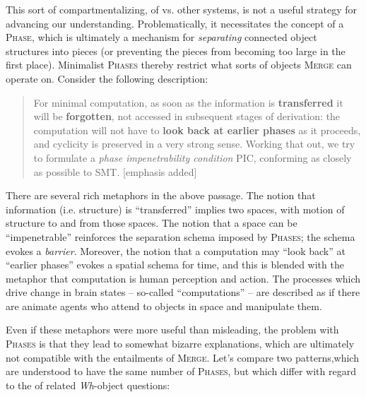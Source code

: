   This sort of compartmentalizing, of  vs. other systems, is not a useful strategy for advancing our understanding. Problematically, it necessitates the  concept of a \textsc{Phase}, which is ultimately a mechanism for \textit{separating} connected object structures into pieces (or preventing the pieces from becoming too large in the first place). Minimalist \textsc{Phases} thereby restrict what sorts of objects \textsc{Merge} can operate on. Consider the following description:

\begin{quote}
For minimal computation, as soon as the information is \textbf{transferred} it will be \textbf{forgotten}, not accessed in subsequent stages of derivation: the computation will not have to \textbf{look back at earlier phases} as it proceeds, and cyclicity is preserved in a very strong sense. Working that out, we try to formulate a \textit{phase \textit{impenetrability} condition} PIC, conforming as closely as possible to SMT. \citep[9]{Chomsky2008} [emphasis added]
\end{quote}

  There are several rich metaphors in the above passage. The notion that information (i.e. structure) is “transferred” implies two spaces, with motion of structure to and from those spaces. The notion that a space can be “impenetrable” reinforces the separation schema imposed by \textsc{Phases}; the schema evokes a \textit{barrier}. Moreover, the notion that a computation may “look back” at “earlier phases” evokes a spatial schema for time, and this is blended with the metaphor that computation is human perception and action. The processes which drive change in brain states -- so-called “computations” -- are described as if there are animate agents who attend to objects in space and manipulate them.

  Even if these metaphors were more useful than misleading, the problem with \textsc{Phases} is that they lead to somewhat bizarre explanations, which are ultimately not compatible with the entailments of \textsc{Merge}. Let's compare two patterns,\linebreak which are understood to have the same number of \textsc{Phases}, but which differ with regard to the  of related \textit{Wh}-object questions:

\ea\label{ex:5:x1}
\z
\z

\ea\label{ex:5:x2}
\z
\z

